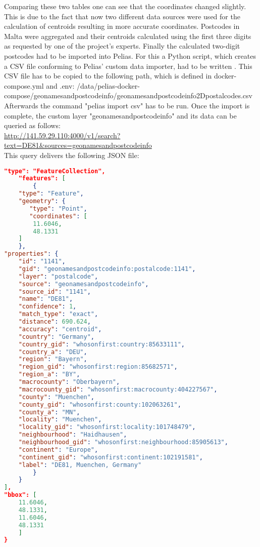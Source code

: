 Comparing these two tables one can see that the coordinates changed slightly. This is due to the fact that now two different data sources were used for the calculation of centroids resulting in more accurate coordinates.
Postcodes in Malta were aggregated and their centroids calculated using the first three digits as requested by one of the project's experts.
Finally the calculated two-digit postcodes had to be imported into Pelias. For this a Python script, which creates a CSV file conforming to Pelias' custom data importer, had to be written \cite{Dechant2019}. This CSV file has to be copied to the following path, which is defined in docker-compose.yml and .env:
/data/pelias-docker-compose/geonamesandpostcodeinfo/geonamesandpostcodeinfo2Dpostalcodes.csv
Afterwards the command "pelias import csv" has to be run. Once the import is complete, the custom layer "geonamesandpostcodeinfo" and its data can be queried as follows:\\

\url{http://141.59.29.110:4000/v1/search?text=DE81&sources=geonamesandpostcodeinfo}\\

This query delivers the following JSON file:\\
\begin{lstlisting}[language=json,breaklines=true]
"type": "FeatureCollection",
    "features": [
 		{
	"type": "Feature",
	"geometry": {
	   "type": "Point",
	   "coordinates": [
	   	11.6046,
		48.1331 
	]
	},
"properties": {
	"id": "1141",
	"gid": "geonamesandpostcodeinfo:postalcode:1141",
	"layer": "postalcode",
	"source": "geonamesandpostcodeinfo",
	"source_id": "1141",
	"name": "DE81",
	"confidence": 1,
	"match_type": "exact",
	"distance": 690.624,
	"accuracy": "centroid",
	"country": "Germany",
	"country_gid": "whosonfirst:country:85633111",
	"country_a": "DEU",
	"region": "Bayern",
	"region_gid": "whosonfirst:region:85682571",
	"region_a": "BY",
	"macrocounty": "Oberbayern",
	"macrocounty_gid": "whosonfirst:macrocounty:404227567",
	"county": "Muenchen",
	"county_gid": "whosonfirst:county:102063261",
	"county_a": "MN",
	"locality": "Muenchen",
	"locality_gid": "whosonfirst:locality:101748479",
	"neighbourhood": "Haidhausen",
	"neighbourhood_gid": "whosonfirst:neighbourhood:85905613",
	"continent": "Europe",
	"continent_gid": "whosonfirst:continent:102191581",
	"label": "DE81, Muenchen, Germany"
		}
	}
],
"bbox": [
	11.6046,
	48.1331,
	11.6046,
	48.1331
	]
}
\end{lstlisting}


